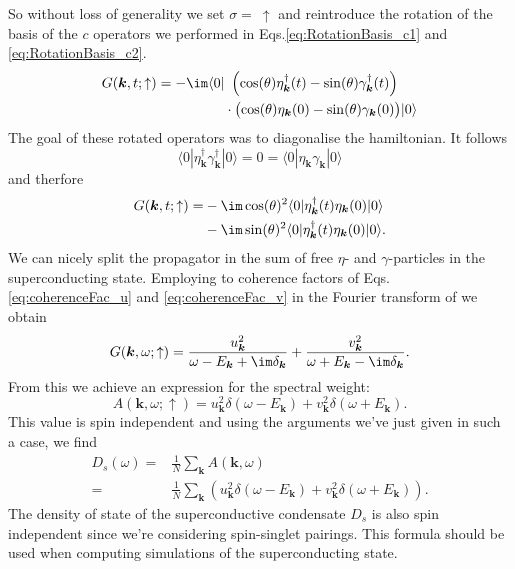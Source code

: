 \documentclass[../main.tex]{subfile}
\begin{document}
So without loss of generality we set $\sigma = ~ \uparrow$ and reintroduce the rotation of the basis of the $c$ operators 
we performed in Eqs.\ref{eq:RotationBasis_c1} and \ref{eq:RotationBasis_c2}.
\begin{align*}
    G(\bm{k},t; \uparrow) = -\im \langle 0 |&~\left(\cos(\theta) \eta_{\bm{k}}^{\dagger}(t) - \sin(\theta) \gamma_{\bm{k}}^{\dagger}(t)\right)\\
    &\cdot\bigl(\cos(\theta) \eta_{\bm{k}}(0) - \sin(\theta) \gamma_{\bm{k}}(0)\bigr) | 0 \rangle
\end{align*}
The goal of these rotated operators was to diagonalise the hamiltonian. It follows
\[
    \langle 0|\eta_{\bm{k}}^{\dagger}\gamma_{\bm{k}}^{\dagger} | 0\rangle = 0 =  \langle 0|\eta_{\bm{k}}\gamma_{\bm{k}} | 0\rangle
\] 
and therfore
\begin{equation}
    \begin{aligned}
        G(\bm{k},t; \uparrow) =& -\im \cos(\theta)^2 \langle 0 | \eta_{\bm{k}}^{\dagger}(t)\eta_{\bm{k}}(0) | 0 \rangle \\
        & -\im\sin(\theta)^2 \langle 0 | \eta_{\bm{k}}^{\dagger}(t)\eta_{\bm{k}}(0) | 0 \rangle .
    \end{aligned}
\end{equation}
We can nicely split the propagator in the sum of free $\eta$- and $\gamma$-particles in the superconducting state.
Employing to coherence factors of Eqs.\ref{eq:coherenceFac_u} and \ref{eq:coherenceFac_v} in the Fourier transform of we obtain
\[
    G(\bm{k}, \omega; \uparrow) = \frac{u_{\bm{k}}^2}{\omega - E_{\bm{k}} + \im\delta_{\bm{k}}} + \frac{v_{\bm{k}}^2}{\omega + E_{\bm{k}} - \im\delta_{\bm{k}}}.
\]
From this we achieve an expression for the spectral weight:
\[
    A(\bm{k}, \omega; \uparrow) = u^2_{\bm{k}}\delta(\omega - E_{\bm{k}}) + v^2_{\bm{k}}\delta(\omega + E_{\bm{k}}).
\]
This value is spin independent and using the arguments we've just given in such a case, we find
\begin{align*}
    D_s(\omega) =& \frac{1}{N} \sum_{\bm{k}} A(\bm{k},\omega)\\
        =& \frac{1}{N} \sum_{\bm{k}} \left(u^2_{\bm{k}}\delta(\omega - E_{\bm{k}}) + v^2_{\bm{k}}\delta(\omega + E_{\bm{k}})\right).
\end{align*}
The density of state of the superconductive condensate $D_s$ is also spin independent since we're considering spin-singlet pairings. This formula should be used
when computing simulations of the superconducting state.\\ 
\end{document}
